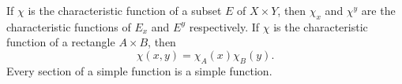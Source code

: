 If $\chi$ is the characteristic function of a subset $E$ of $X \times Y$, then $\chi_x$ and $\chi^y$ are the characteristic functions of $E_x$ and $E^y$ respectively. If $\chi$ is the characteristic function of a rectangle $A \times B$, then
$$\chi(x,y) = \chi_A(x) \chi_B(y).$$
Every section of a simple function is a simple function.
